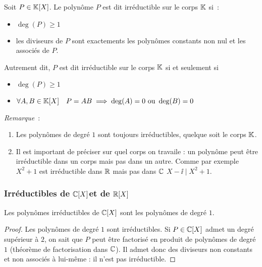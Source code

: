 \begin{defdef}
  Soit \(P \in \mathbb{K}[X]\). Le polynôme \(P\) est dit irréductible sur le corps \(\mathbb{K}\) si~:
  \begin{itemize}
  \item \(\deg(P) \geqslant 1\)
  \item les diviseurs de \(P\) sont exactements les polynômes constants non nul et les associés de \(P\).
  \end{itemize}
  Autrement dit, \(P\) est dit irréductible sur le corps \(\mathbb{K}\) si et seulement si
  \begin{itemize}
  \item \(\deg(P) \geqslant 1\)
  \item \(\forall A,B \in \mathbb{K}[X] \quad P=AB \implies \deg(A)=0 \text{~ou~} \deg(B)=0\)
  \end{itemize}
\end{defdef}

\emph{Remarque}~:
\begin{enumerate}
\item Les polynômes de degré \(1\) sont toujours irréductibles, quelque soit le corps \(\mathbb{K}\).
\item Il est important de préciser sur quel corps on travaile : un polynôme peut être irréductible dans un corps mais pas dans un autre. Comme par exemple \(X^2+1\) est irréductible dans \(\mathbb{R}\) mais pas dans \(\mathbb{C}\) \(X-\ii\mid{}X^2+1\).
\end{enumerate}

\subsubsection{Irréductibles de \(\mathbb{C}[X]\)et de \(\mathbb{R}[X]\)}

\begin{prop}
  Les polynômes irréductibles de \(\mathbb{C}[X]\) sont les polynômes de degré \(1\).
\end{prop}
\begin{proof}
  Les polynômes de degré \(1\) sont irréductibles. Si \(P\in \mathbb{C}[X]\) admet un degré supérieur à \(2\), on sait que \(P\) peut être factorisé en produit de polynômes de degré \(1\) (théorème de factorisation dans \(\mathbb{C}\)). Il admet donc des diviseurs non constants et non associés à lui-même : il n'est pas irréductible.
\end{proof}

